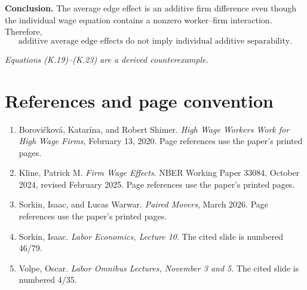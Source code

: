 \documentclass[11pt]{article}
\begin{document}
\textbf{Conclusion.}
The average edge effect is an additive firm difference even though the
individual wage equation contains a nonzero worker--firm interaction.
Therefore,
\[
\boxed{
\text{additive average edge effects do not imply individual additive
separability}.
}
\tag{K.23}
\]

\textit{Equations (K.19)--(K.23) are a derived counterexample.}

\section*{References and page convention}

\begin{enumerate}
\item Borovi\v{c}kov\'a, Katar\'ina, and Robert Shimer.
\emph{High Wage Workers Work for High Wage Firms}, February 13, 2020.
Page references use the paper's printed pages.
\item Kline, Patrick M.  \emph{Firm Wage Effects}.  NBER Working Paper
33084, October 2024, revised February 2025.  Page references use the
paper's printed pages.
\item Sorkin, Isaac, and Lucas Warwar.  \emph{Paired Movers}, March 2026.
Page references use the paper's printed pages.
\item Sorkin, Isaac.  \emph{Labor Economics, Lecture 10}.  The cited slide
is numbered 46/79.
\item Volpe, Oscar.  \emph{Labor Omnibus Lectures, November 3 and 5}.
The cited slide is numbered 4/35.
\end{enumerate}
\end{document}

